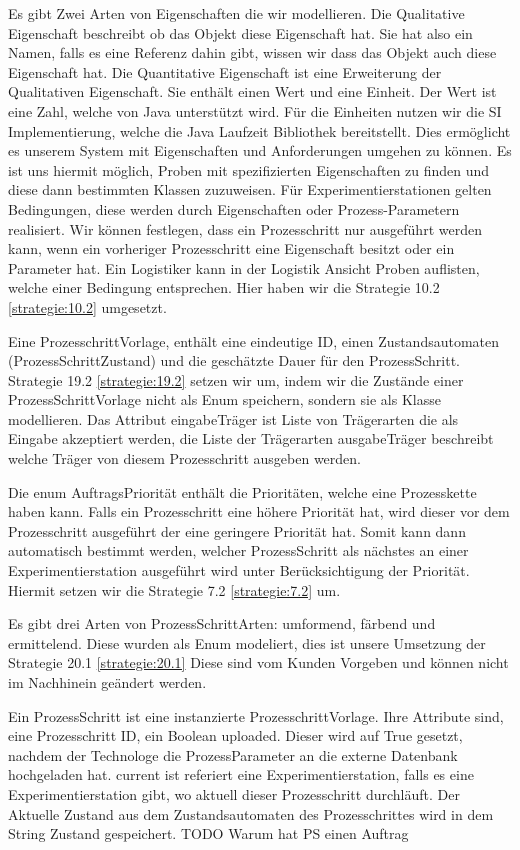 \documentclass[enabledeprecatedfontcommands,fontsize=12pt,paper=a4,twoside]{scrartcl}
\begin{document}
{Es gibt Zwei Arten von Eigenschaften die wir modellieren. Die Qualitative
Eigenschaft beschreibt ob das Objekt diese Eigenschaft hat. Sie hat also ein
Namen, falls es eine Referenz dahin gibt, wissen wir dass das Objekt auch diese
Eigenschaft hat. Die Quantitative Eigenschaft ist eine Erweiterung der
Qualitativen Eigenschaft. Sie enthält einen Wert und eine Einheit. Der Wert ist
eine Zahl, welche von Java unterstützt wird. Für die Einheiten nutzen wir die SI
Implementierung, welche die Java Laufzeit Bibliothek bereitstellt. Dies
ermöglicht es unserem System mit Eigenschaften und Anforderungen umgehen zu
können. Es ist uns hiermit möglich, Proben mit spezifizierten Eigenschaften zu
finden und diese dann bestimmten Klassen zuzuweisen. Für Experimentierstationen gelten
Bedingungen, diese werden durch Eigenschaften oder Prozess-Parametern realisiert.
Wir können festlegen, dass ein Prozesschritt nur ausgeführt werden kann, wenn
ein vorheriger Prozesschritt eine Eigenschaft besitzt oder ein Parameter hat.
Ein Logistiker kann in der Logistik Ansicht Proben auflisten, welche
einer Bedingung entsprechen. Hier haben wir die Strategie 10.2 \ref{strategie:10.2} umgesetzt.

Eine ProzesschrittVorlage, enthält eine eindeutige ID, einen Zustandsautomaten
(ProzessSchrittZustand) und die geschätzte Dauer für den ProzessSchritt.
Strategie 19.2 \ref{strategie:19.2}  setzen wir um, indem wir die Zustände einer ProzessSchrittVorlage
nicht als Enum speichern, sondern sie als Klasse modellieren.
Das Attribut eingabeTräger ist Liste von Trägerarten die als Eingabe akzeptiert
werden, die Liste der Trägerarten ausgabeTräger beschreibt welche Träger von
diesem Prozesschritt ausgeben werden.

Die enum AuftragsPriorität enthält die Prioritäten, welche eine Prozesskette
haben kann. Falls ein Prozesschritt eine höhere Priorität hat, wird dieser vor
dem Prozesschritt ausgeführt der eine geringere Priorität hat.  Somit kann dann
automatisch bestimmt werden, welcher ProzessSchritt als nächstes an einer
Experimentierstation ausgeführt wird unter Berücksichtigung der Priorität.
Hiermit setzen wir die Strategie 7.2 \ref{strategie:7.2}  um.

Es gibt drei Arten von ProzessSchrittArten: umformend, färbend und ermittelend.
Diese wurden als Enum modeliert, dies ist unsere Umsetzung der Strategie 20.1 \ref{strategie:20.1} 
Diese sind vom Kunden Vorgeben und können nicht im Nachhinein geändert werden.

Ein ProzessSchritt ist eine instanzierte ProzesschrittVorlage. Ihre Attribute
sind, eine Prozesschritt ID, ein Boolean uploaded. Dieser wird auf True gesetzt,
nachdem der Technologe die ProzessParameter an die externe Datenbank hochgeladen
hat. current ist referiert eine Experimentierstation, falls es eine
Experimentierstation gibt, wo aktuell dieser Prozesschritt durchläuft. Der
Aktuelle Zustand aus dem Zustandsautomaten des Prozesschrittes wird in dem
String Zustand gespeichert. TODO Warum hat PS einen Auftrag

}
\end{document}
